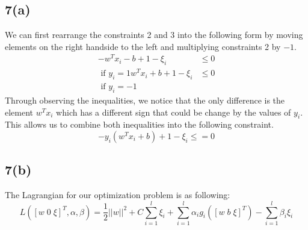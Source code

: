 \subsection*{7(a)}
We can first rearrange the constraints 2 and 3 into the following form by moving elements on the right handside to the left and multiplying constraints 2 by $-1$.
\begin{equation*}
\begin{aligned}
- w^Tx_i - b + 1 - \xi_i &\leq 0\\ \mbox{ if } y_i = 1
w^Tx_i + b + 1 - \xi_i &\leq 0\\ \mbox{ if } y_i = -1
\end{aligned} 
\end{equation*}
Through observing the inequalities, we notice that the only difference is the element $w^Tx_i$ which has a different sign that could be change by the values of $y_i$. This allows us to combine both inequalities into the following constraint.
\begin{equation*}
- y_i(w^Tx_i + b) + 1 - \xi_i \leq = 0
\end{equation*}

\subsection*{7(b)}
The Lagrangian for our optimization problem is as following:
\begin{equation*}
L ([w\;0\;\xi]^T, \alpha, \beta) = \frac{1}{2}||w||^2 + C \sum_{i=1}^l \xi_i + \sum_{i=1}^l \alpha_ig_i([w\;b\;\xi]^T) - \sum_{i=1}^l \beta_i \xi_i
\end{equation*}

